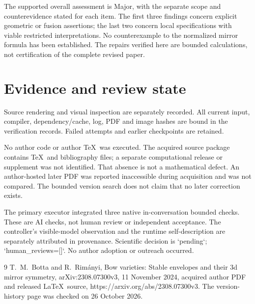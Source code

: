\documentclass[10pt]{article}
\begin{document}
The supported overall assessment is Major, with the separate scope and counterevidence stated for each item. The first three findings concern explicit geometric or fusion assertions; the last two concern local specifications with viable restricted interpretations. No counterexample to the normalized mirror formula has been established. The repairs verified here are bounded calculations, not certification of the complete revised paper.\par
\section*{Evidence and review state}
Source rendering and visual inspection are separately recorded. All current input, compiler, dependency/cache, log, PDF and image hashes are bound in the verification records. Failed attempts and earlier checkpoints are retained.\par
No author code or author TeX was executed. The acquired source package contains TeX and bibliography files; a separate computational release or supplement was not identified. That absence is not a mathematical defect. An author-hosted later PDF was reported inaccessible during acquisition and was not compared. The bounded version search does not claim that no later correction exists.\par
The primary executor integrated three native in-conversation bounded checks. These are AI checks, not human review or independent acceptance. The controller’s visible-model observation and the runtime self-description are separately attributed in provenance. Scientific decision is `pending`; `human\_reviews=[]`. No author adoption or outreach occurred.\par
9 T. M. Botta and R. Rimányi, Bow varieties: Stable envelopes and their 3d mirror symmetry, arXiv:2308.07300v3, 11 November 2024, acquired author PDF and released LaTeX source, https://arxiv.org/abs/2308.07300v3. The version-history page was checked on 26 October 2026.\par
\end{document}
